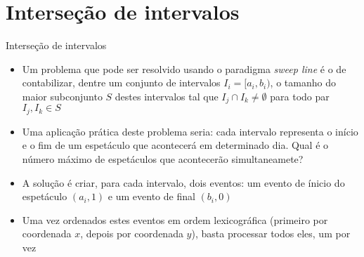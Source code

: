 \section{Interseção de intervalos}

\begin{frame}[fragile]{Interseção de intervalos}

    \begin{itemize}
        \item Um problema que pode ser resolvido usando o paradigma \textit{sweep line} é o de
            contabilizar, dentre um conjunto de intervalos $I_i = [a_i, b_i)$, o tamanho do maior 
            subconjunto $S$ destes intervalos tal que $I_j \cap I_k \neq \emptyset$ para todo
            par $I_j, I_k\in S$ 
        \pause

        \item Uma aplicação prática deste problema seria: cada intervalo representa o início e o
            fim de um espetáculo que acontecerá em determinado dia. Qual é o número máximo de
            espetáculos que acontecerão simultaneamete?
        \pause

        \item A solução é criar, para cada intervalo, dois eventos: um evento de ínicio do 
            espetáculo $(a_i, 1)$ e um evento de final $(b_i, 0)$
        \pause

        \item Uma vez ordenados estes eventos em ordem lexicográfica (primeiro por coordenada $x$,
            depois por coordenada $y$), basta processar todos eles, um por vez

    \end{itemize}

\end{frame}

